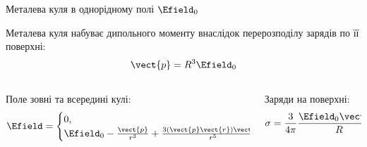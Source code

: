 \documentclass{beamer}
\begin{document}
\begin{frame}{Металева куля в однорідному полі $\Efield_0$}{}
	\begin{center}
		
	\end{center}
	\begin{block}{}\justifying
		Металева куля набуває дипольного моменту внаслідок 	перерозподілу зарядів по її поверхні:
		\begin{equation*}
			\vect{p} = R^3\Efield_0
		\end{equation*}
	\end{block}
\begin{columns}
	\begin{column}{0.5\linewidth}
	\begin{block}{}\centering
		Поле зовні та всередині кулі:
\begin{equation*}
    			\Efield =
			\begin{cases}
				0,
				        & r \le R \\
				\Efield_0 - \frac{\vect{p}}{r^3} + \frac{3\left(\vect{p}\vect{r}\right)\vect{r}
				}{r^5}, & r > R,
			\end{cases}
\end{equation*}
	\end{block}
	\end{column}
	\begin{column}{0.5\linewidth}
	\begin{block}{}\centering
		Заряди на поверхні:
        \begin{equation*}
     			\sigma = \frac{3}{4\pi} \frac{\Efield_0\vect{r}}{R}.
        \end{equation*}
	\end{block}
	\end{column}
\end{columns}

\end{frame}
\end{document}
